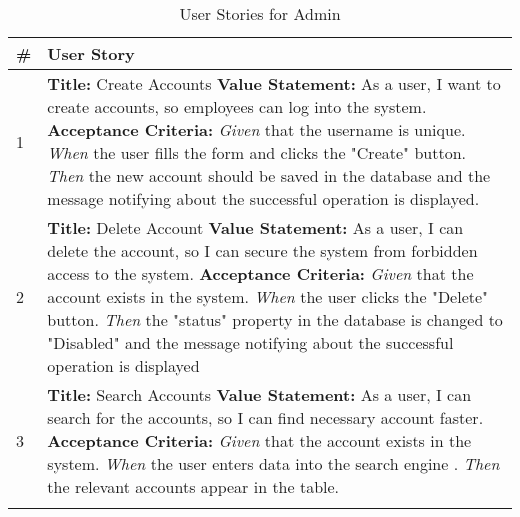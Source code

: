 \documentclass[a4paper]{article}
\begin{document}
  

        \begin{longtable}{|p{0.5cm}||p{}|}
          \caption{User Stories for Admin}
        \label{AdminUserStories} \\
              \hline
            \# & User Story  \\
            \hline
            \endhead

             1 & \textbf{Title:}  Create Accounts  \newline
                 \textbf{Value Statement:} As a user, I want to create accounts, so employees can log into the system. \newline
                \textbf{Acceptance Criteria:} \newline
                 \emph{Given} that the username is unique.\newline 
                 \emph{When} the user fills the form and clicks the "Create" button.\newline
                 \emph{Then} the new account should be saved in the database and the message notifying about the successful operation is displayed.
                \\            
            \hline
             2 & \textbf{Title:}  Delete Account  \newline
                 \textbf{Value Statement:} As a user, I can delete the account, so I can secure the system from forbidden access to the system.\newline
                \textbf{Acceptance Criteria:} \newline
                 \emph{Given} that the account exists in the system.\newline 
                 \emph{When} the user clicks the "Delete" button.\newline
                 \emph{Then} the "status" property in the database is changed to "Disabled" and the message notifying about the successful operation is displayed   \\
            \hline
             3 & \textbf{Title:}  Search Accounts  \newline
                 \textbf{Value Statement:} As a user, I can search for the accounts, so I can find necessary  account faster.  \newline
                 \textbf{Acceptance Criteria:} \newline
                  \emph{Given} that the account exists in the system.\newline 
                 \emph{When} the user enters data into the search engine .\newline
                 \emph{Then} the relevant accounts appear in the table.  \\
            \\
            \hline
    \end{longtable}
    
\end{document}
